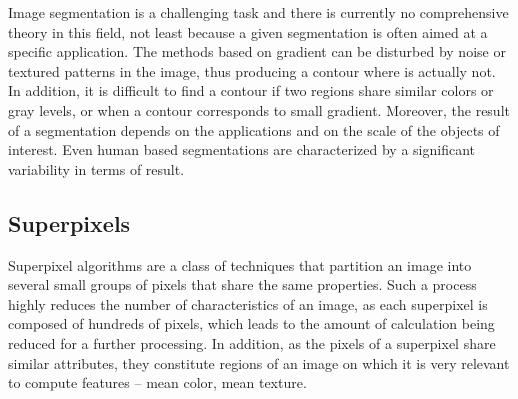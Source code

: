 \documentclass{article}
\begin{document}
        Image segmentation is a challenging task and there is currently no comprehensive theory in this field, not least because a given segmentation is often aimed at a specific application. The methods based on gradient can be disturbed by noise or textured patterns in the image, thus producing a contour where is actually not. In addition, it is difficult to find a contour if two regions share similar colors or gray levels, or when a contour corresponds to small gradient. Moreover, the result of a segmentation depends on the applications and on the scale of the objects of interest. Even human based segmentations are characterized by a significant variability in terms of result.

    \subsection{Superpixels}
        Superpixel algorithms are a class of techniques that partition an image into several small groups of pixels that share the same properties. Such a process highly reduces the number of characteristics of an image, as each superpixel is composed of hundreds of pixels, which leads to the amount of calculation being reduced for a further processing. In addition, as the pixels of a superpixel share similar attributes, they constitute regions of an image on which it is very relevant to compute features -- mean color, mean texture.
\end{document}
